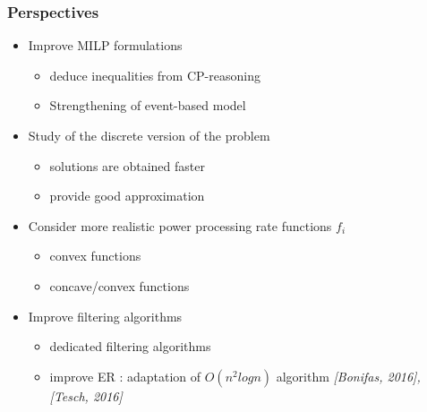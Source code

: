 \documentclass{beamer}
\begin{document}
  \begin{frame}
    \frametitle{Perspectives}
    \vfill
    \begin{itemize}
    \item Improve MILP formulations
      \pause
      \begin{itemize}
      \item deduce inequalities from CP-reasoning
      \item Strengthening of event-based model
      \end{itemize}
      \vfill
      \pause
    \item Study of the discrete version of the problem
      \begin{itemize}
        \pause
      \item solutions are obtained faster  
      \item provide good approximation
      \end{itemize}
      \vfill
      \pause
    \item Consider more realistic power processing rate functions
      $f_i$
      \begin{itemize}
        \pause
      \item convex functions
      \item concave/convex functions
      \end{itemize}
      \vfill
      \pause
    \item Improve filtering algorithms
      \begin{itemize}
        \pause
      \item dedicated filtering algorithms
      \item improve ER : adaptation of $O(n^2 log n)$ algorithm
        {\small \it \color{gray!50!black!50} [Bonifas, 2016], [Tesch,
          2016]}  
      \end{itemize}
    \end{itemize}
    \vfill
  \end{frame}
\end{document}
